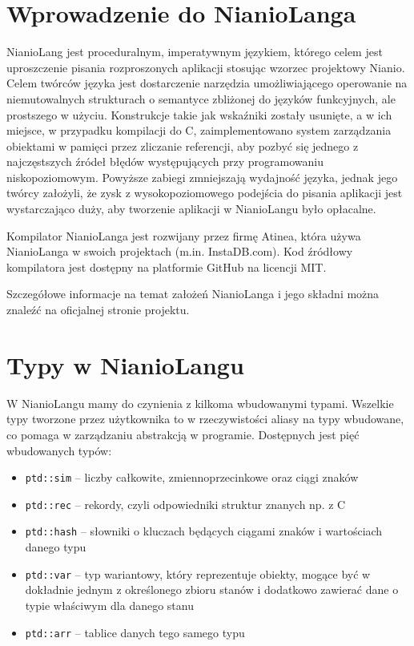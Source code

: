 \documentclass[licencjacka]{pracamgr}
\begin{document}
\section{Wprowadzenie do NianioLanga}
NianioLang jest proceduralnym, imperatywnym językiem, którego celem jest
uproszczenie pisania rozproszonych aplikacji stosując wzorzec projektowy
Nianio\cite{wzorzec_nianio}.
Celem twórców języka jest dostarczenie narzędzia umożliwiającego operowanie na niemutowalnych strukturach
o semantyce zbliżonej do języków funkcyjnych, ale prostszego w użyciu.
Konstrukcje takie jak wskaźniki zostały usunięte, a w ich miejsce, w przypadku kompilacji do C,
zaimplementowano system zarządzania obiektami
w pamięci przez zliczanie referencji, aby pozbyć się jednego z najczęstszych źródeł błędów występujących przy programowaniu niskopoziomowym.
Powyższe zabiegi zmniejszają wydajność języka, jednak jego twórcy założyli, że zysk z wysokopoziomowego podejścia
do pisania aplikacji jest wystarczająco duży, aby tworzenie aplikacji w NianioLangu było opłacalne.

Kompilator NianioLanga jest rozwijany przez firmę Atinea, która używa NianioLanga w swoich projektach (m.in. InstaDB.com).
Kod źródłowy kompilatora jest dostępny na platformie GitHub\cite{github_repo_nianiolang_original} na licencji MIT.

Szczegółowe informacje na temat założeń NianioLanga i jego składni można znaleźć na oficjalnej
stronie projektu\cite{nianiolang_org}.

\section{Typy w NianioLangu}
W NianioLangu mamy do czynienia z kilkoma wbudowanymi typami. Wszelkie typy tworzone przez użytkownika to w rzeczywistości aliasy na typy wbudowane,
co pomaga w zarządzaniu abstrakcją w programie. Dostępnych jest pięć wbudowanych typów: 
\begin{itemize}
  \item \texttt{ptd::sim} -- liczby całkowite, zmiennoprzecinkowe oraz ciągi znaków
  \item \texttt{ptd::rec} -- rekordy, czyli odpowiedniki struktur znanych np. z C
  \item \texttt{ptd::hash} -- słowniki o kluczach będących ciągami znaków i wartościach danego typu
  \item \texttt{ptd::var} -- typ wariantowy, który reprezentuje obiekty, mogące być w dokładnie jednym z określonego zbioru stanów i dodatkowo
  zawierać dane o typie właściwym dla danego stanu
  \item \texttt{ptd::arr} -- tablice danych tego samego typu
\end{itemize}
\end{document}
